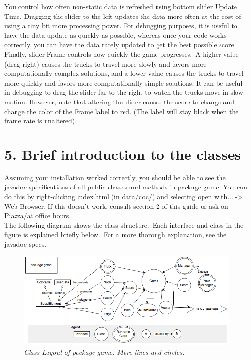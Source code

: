\documentclass[11pt]{article}
\begin{document}
You control how often non-static data is refreshed using bottom slider Update Time. Dragging the slider to the left updates the data more often at the cost of using a tiny bit more processing 
power. For debugging purposes, it is useful to have the data update as quickly as possible, whereas once your code works correctly, you can have the data rarely updated to get the best possible score.\\

Finally, slider Frame controls how quickly the game progresses.\ A higher value (drag right) causes the trucks to travel more slowly and favors more computationally complex solutions, and a lower value causes the trucks to travel more quickly and favors more computationally simple solutions. It can be useful in debugging to drag the slider far to the right to watch the trucks move in slow motion. However, note that altering the slider causes the score to change and change the color of the Frame label to red. (The label will stay black when the frame rate is unaltered).\\

\section{5. Brief introduction to the classes}
Assuming your installation worked correctly, you should be able to see the javadoc specifications of all public classes and methods in package game. You can do this by right-clicking index.html (in data/doc/) and selecting open with... -> Web Browser. If this doesn't work, consult section 2 of this guide or ask on Piazza/at office hours.\\

The following diagram shows the class structure.\ Each interface and class in the figure is explained briefly below.\ For a more thorough explanation, see the javadoc specs.
\begin{figure}[h]
\centerline{\includegraphics[scale=0.7]{hirearchy.png}} 
\caption{\em{Class Layout of package game. More lines and circles.}}
\end{figure}
\end{document}
